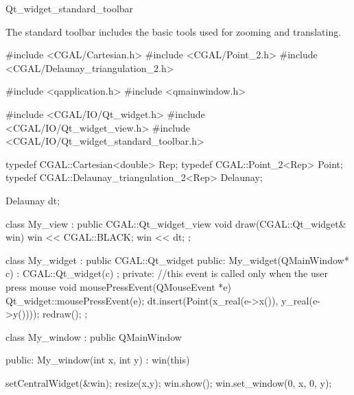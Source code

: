 
\begin{ccRefClass}{Qt_widget_standard_toolbar}

\ccDefinition

The standard toolbar includes the basic tools used for zooming and translating.

\ccGlue

\ccCreation
{}


\begin{ccExampleCode}
#include <CGAL/Cartesian.h>
#include <CGAL/Point_2.h>
#include <CGAL/Delaunay_triangulation_2.h>


#include <qapplication.h>
#include <qmainwindow.h>

#include <CGAL/IO/Qt_widget.h>
#include <CGAL/IO/Qt_widget_view.h>
#include <CGAL/IO/Qt_widget_standard_toolbar.h>

typedef CGAL::Cartesian<double>		    Rep;
typedef CGAL::Point_2<Rep>		    Point;
typedef CGAL::Delaunay_triangulation_2<Rep> Delaunay;

Delaunay dt;

class My_view : public CGAL::Qt_widget_view{
  void draw(CGAL::Qt_widget& win){
    win << CGAL::BLACK;
    win << dt;
  }
};

class My_widget : public CGAL::Qt_widget {
public:
  My_widget(QMainWindow* c) : CGAL::Qt_widget(c) {};
private:
  //this event is called only when the user press mouse
  void mousePressEvent(QMouseEvent *e)
  {
    Qt_widget::mousePressEvent(e);
    dt.insert(Point(x_real(e->x()), y_real(e->y())));
    redraw();
  }
};

class My_window : public QMainWindow{
public:
  My_window(int x, int y) : win(this)
  {
    setCentralWidget(&win);
    resize(x,y);
    win.show();
    win.set_window(0, x, 0, y);
    
}}
\end{ccExampleCode}
\end{ccRefClass}
